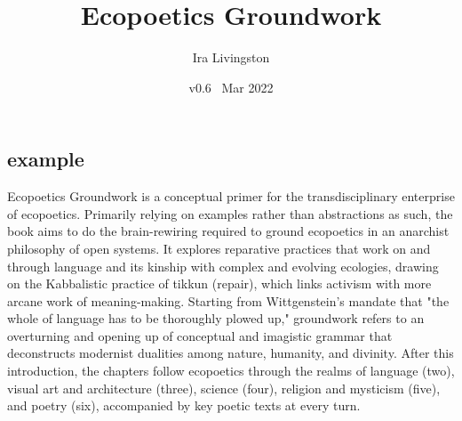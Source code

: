 \documentclass[draft]{article}
\title{Ecopoetics Groundwork}
\author{Ira Livingston}
\date{v0.6 \ Mar 2022}
\begin{document}
\maketitle
\subsection{example}

\shapepar\diamondshape
Ecopoetics Groundwork is a conceptual primer for the transdisciplinary enterprise of ecopoetics.  Primarily relying on examples rather than abstractions as such, the book aims to do the brain-rewiring required to ground ecopoetics in an anarchist philosophy of open systems.  It explores reparative practices that work on and through language and its kinship with complex and evolving ecologies, drawing on the Kabbalistic practice of tikkun (repair), which links activism with more arcane work of meaning-making.  Starting from Wittgenstein's mandate that "the whole of language has to be thoroughly plowed up," groundwork refers to an overturning and opening up of conceptual and imagistic grammar that deconstructs modernist dualities among nature, humanity, and divinity.  After this introduction, the chapters follow ecopoetics through the realms of language (two), visual art and architecture (three), science (four), religion and mysticism (five), and poetry (six), accompanied by key poetic texts at every turn.
\end{document}
